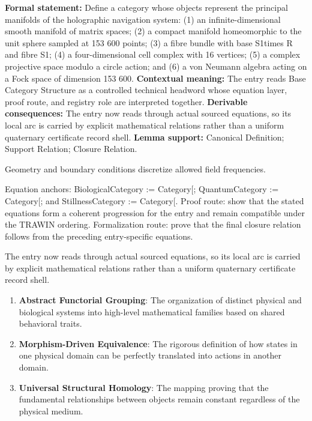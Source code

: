 \begingroup\footnotesize\setlength{\emergencystretch}{3em}\sloppy
\textbf{Formal statement:} Define a category whose objects represent the principal manifolds of the holographic navigation system: (1) an infinite-dimensional smooth manifold of matrix spaces; (2) a compact manifold homeomorphic to the unit sphere sampled at 153 600 points; (3) a fibre bundle with base S1times R and fibre S1; (4) a four-dimensional cell complex with 16 vertices; (5) a complex projective space modulo a circle action; and (6) a von Neumann algebra acting on a Fock space of dimension 153 600. \textbf{Contextual meaning:} The entry reads Base Category Structure as a controlled technical headword whose equation layer, proof route, and registry role are interpreted together. \textbf{Derivable consequences:} The entry now reads through actual sourced equations, so its local arc is carried by explicit mathematical relations rather than a uniform quaternary certificate record shell. \textbf{Lemma support:} Canonical Definition; Support Relation; Closure Relation.\par
\endgroup

Geometry and boundary conditions discretize allowed field frequencies.

Equation anchors: BiologicalCategory := Category[; QuantumCategory := Category[; and StillnessCategory := Category[. Proof route: show that the stated equations form a coherent progression for the entry and remain compatible under the TRAWIN ordering. Formalization route: prove that the final closure relation follows from the preceding entry-specific equations.

The entry now reads through actual sourced equations, so its local arc is carried by explicit mathematical relations rather than a uniform quaternary certificate record shell.
\endgroup

\begin{enumerate}[leftmargin=1.6em,itemsep=6pt,topsep=4pt]
\item \textbf{Abstract Functorial Grouping}: The organization of distinct physical and biological systems into high-level mathematical families based on shared behavioral traits.
\item \textbf{Morphism-Driven Equivalence}: The rigorous definition of how states in one physical domain can be perfectly translated into actions in another domain.
\item \textbf{Universal Structural Homology}: The mapping proving that the fundamental relationships between objects remain constant regardless of the physical medium.
\end{enumerate}

